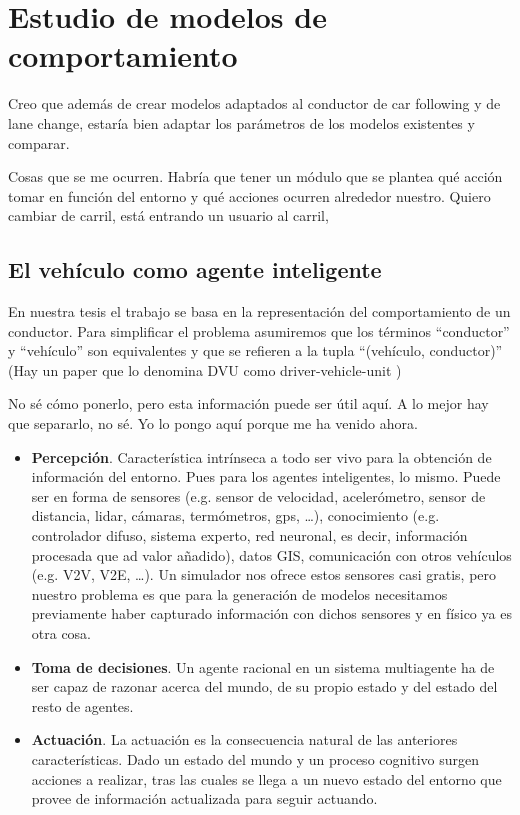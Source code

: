 \chapter{Estudio de modelos de comportamiento}
\label{ch:behavior-models-study}

Creo que además de crear modelos adaptados al conductor de car following y de lane change, estaría bien adaptar los parámetros de los modelos existentes y comparar.

Cosas que se me ocurren. Habría que tener un módulo que se plantea qué acción tomar en función del entorno y qué acciones ocurren alrededor nuestro. Quiero cambiar de carril, está entrando un usuario al carril, 

\section{El vehículo como agente inteligente}

En nuestra tesis el trabajo se basa en la representación del comportamiento de un conductor. Para simplificar el problema asumiremos que los términos \enquote{conductor} y \enquote{vehículo} son equivalentes y que se refieren a la tupla \enquote{(vehículo, conductor)} (Hay un paper que lo denomina DVU como driver-vehicle-unit \cite{Dia2002})

No sé cómo ponerlo, pero esta información puede ser útil aquí. A lo mejor hay que separarlo, no sé. Yo lo pongo aquí porque me ha venido ahora.

\begin{itemize}
	\item \textbf{Percepción}. Característica intrínseca a todo ser vivo para la obtención de información del entorno. Pues para los agentes inteligentes, lo mismo. Puede ser en forma de sensores (e.g. sensor de velocidad, acelerómetro, sensor de distancia, lidar, cámaras, termómetros, gps, \ldots), conocimiento (e.g. controlador difuso, sistema experto, red neuronal, es decir, información procesada que ad valor añadido), datos GIS, comunicación con otros vehículos (e.g. V2V, V2E, \ldots). Un simulador nos ofrece estos sensores casi gratis, pero nuestro problema es que para la generación de modelos necesitamos previamente haber capturado información con dichos sensores y en físico ya es otra cosa.
	\item \textbf{Toma de decisiones}. Un agente racional en un sistema multiagente ha de ser capaz de razonar acerca del mundo, de su propio estado y del estado del resto de agentes.
	\item \textbf{Actuación}. La actuación es la consecuencia natural de las anteriores características. Dado un estado del mundo y un proceso cognitivo surgen acciones a realizar, tras las cuales se llega a un nuevo estado del entorno que provee de información actualizada para seguir actuando.
\end{itemize}


